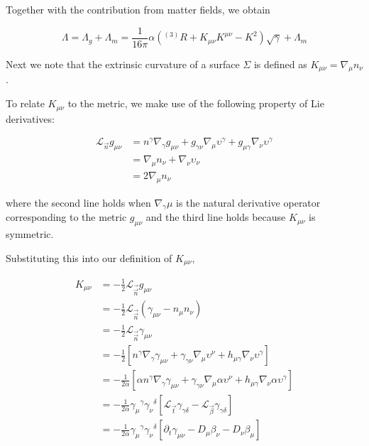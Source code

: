 {    Together with the contribution from matter fields, we obtain
    
    \begin{equation}
        \Lambda = \Lambda_g+\Lambda_m= \frac{1}{16\pi}\alpha({^{(3)}R} + K_{\mu\nu}K^{\mu\nu} - K^2)\sqrt{\gamma}+\Lambda_m
    \end{equation}
    
    Next we note that the extrinsic curvature of a
    surface $\Sigma$ is defined as $K_{\mu\nu} = \nabla_{\mu}n_{\nu}$. 
    
    To relate $K_{\mu\nu}$ to the metric, we make use of the following property of Lie derivatives:
    
    \begin{align}
        \mathcal{L}_{\vec{n}}g_{\mu\nu} &= n^{\gamma}\nabla_{\gamma}g_{\mu\nu} + g_{\gamma\nu}\nabla_{\mu}\upsilon^{\gamma} + g_{\mu\gamma}\nabla_{\nu}\upsilon^{\gamma} \\
        &= \nabla_{\mu}n_{\nu}+\nabla_{\nu}\upsilon_{\nu} \\
        &=2\nabla_{\mu}n_{\nu}
    \end{align}
    
    where the second line holds when $\nabla_{\gamma}\mu$ is the natural derivative operator corresponding to the metric $g_{\mu\nu}$ and the third line holds because $K_{\mu\nu}$ is symmetric.
    
    Substituting this into our definition of $K_{\mu\nu}$,
    
    \begin{align}
        K_{\mu\nu} &= -\frac{1}{2}\mathcal{L}_{\vec{\vec{n}}}g_{\mu\nu} \\
        &= -\frac{1}{2}\mathcal{L}_{\vec{\vec{n}}}(\gamma_{\mu\nu}-n_{\mu}n_{\nu}) \\
        &= -\frac{1}{2}\mathcal{L}_{\vec{\vec{n}}}\gamma_{\mu\nu} \\
        &= -\frac{1}{2}[n^{\gamma}\nabla_{\gamma}\gamma_{\mu\nu} + \gamma_{\gamma\nu}\nabla_{\mu}\upsilon^{\nu} + h_{\mu\gamma}\nabla_{\nu}\upsilon^{\gamma}] \\
        &= -\frac{1}{2\alpha}[\alpha n^{\gamma}\nabla_{\gamma}\gamma_{\mu\nu} + \gamma_{\gamma\nu}\nabla_{\mu}\alpha\upsilon^{\nu} + h_{\mu\gamma}\nabla_{\nu}\alpha\upsilon^{\gamma}] \\
        &= -\frac{1}{2\alpha}{\gamma_{\mu}}^{\gamma}{\gamma_{\nu}}^{\delta}[\mathcal{L}_{\vec{t}}\gamma_{\gamma\delta}-\mathcal{L}_{\vec{\beta}}\gamma_{\gamma\delta}] \\
        &= -\frac{1}{2\alpha}{\gamma_{\mu}}^{\gamma}{\gamma_{\nu}}^{\delta}[\partial_t\gamma_{\mu\nu}-D_{\mu}\beta_{\nu}-D_{\nu}\beta_{\mu}]
    \end{align}
    
}
